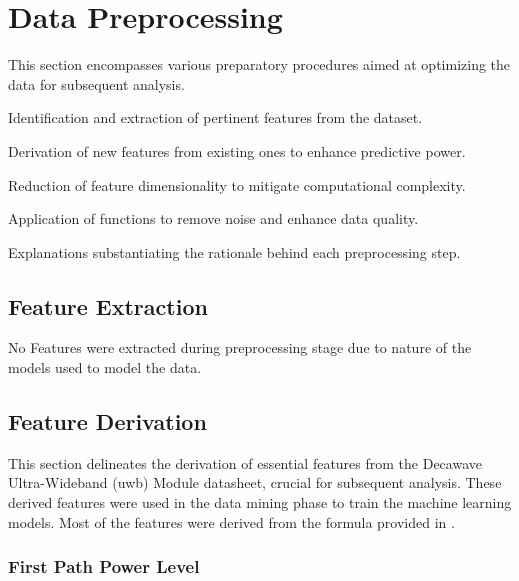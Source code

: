 \section{Data Preprocessing}\label{data_preprocessing}

This section encompasses various preparatory procedures aimed at optimizing the data for subsequent analysis.

\begin{description}[style=nextline]
    \item[Feature Extraction:] Identification and extraction of pertinent features from the dataset.
    \item[Feature Derivation:] Derivation of new features from existing ones to enhance predictive power.
    \item[Feature Reduction:] Reduction of feature dimensionality to mitigate computational complexity.
    \item[De-Noise Functions:] Application of functions to remove noise and enhance data quality.
    \item[Justifications of Processes:] Explanations substantiating the rationale behind each preprocessing step.
\end{description}

\subsection{Feature Extraction}\label{feature_extraction}

No Features were extracted during preprocessing stage due to nature of the models used to model the data.


\subsection{Feature Derivation}\label{feature_derivation}

This section delineates the derivation of essential features from the Decawave Ultra-Wideband (\acrshort{uwb}) Module datasheet, crucial for subsequent analysis. These derived features were used in the data mining phase to train the machine learning models. Most of the features were derived from the formula provided in \cite{DecawaveDW1000}.

\subsubsection{First Path Power Level}\label{first_path_power_level}

